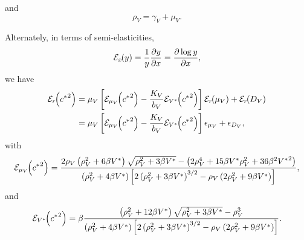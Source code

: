 \documentclass{article}
\newcommand{\md}{\mathrm{d}}
\newcommand{\elasticity}[2]{\mathcal{E}_{#2}\negthickspace\left({#1}\right)}
\begin{document}
and
\begin{equation}
  \rho_V = \gamma_V + \mu_V.
\end{equation}


Alternately, in terms of semi-elasticities,
\begin{equation}
  \elasticity{y}{x}
  = \frac{1}{y} \frac{\partial y}{\partial x}
  = \frac{\partial \log y}{\partial x},
\end{equation}
we have
\begin{equation}
  \begin{split}
    \elasticity{{c^*}^2}{r}
    &=
    \mu_V \left[
      \elasticity{{c^*}^2}{\mu_V}
      - \frac{K_V}{b_V} \elasticity{{c^*}^2}{V^*}
    \right]
    \elasticity{\mu_V}{r}
    +
    \elasticity{D_V}{r}
    \\
    &=
    \mu_V \left[
      \elasticity{{c^*}^2}{\mu_V}
      - \frac{K_V}{b_V} \elasticity{{c^*}^2}{V^*}
    \right]
    \epsilon_{\mu_V}
    +
    \epsilon_{D_V},
  \end{split}
\end{equation}
with
\begin{equation}
  \elasticity{{c^*}^2}{\mu_V}
  =
  \frac{
    2 \rho_V \left(\rho_V^2 + 6 \beta V^*\right)
    \sqrt{\rho_V^2 + 3 \beta V^*}
    - \left(
      2 \rho_V^4
      + 15 \beta V^* \rho_V^2
      + 36 \beta^2 {V^*}^2
    \right)
  }
  {\left(\rho_V^2 + 4 \beta V^*\right)
    \left[2 \left(\rho_V^2 + 3 \beta V^*\right)^{3/2}
      - \rho_V \left(2 \rho_V^2 + 9 \beta V^*\right)\right]},
\end{equation}
and
\begin{equation}
  \elasticity{{c^*}^2}{V^*}
  =
  \beta
  \frac{\left(\rho_V^2 + 12 \beta V^*\right)
    \sqrt{\rho_V^2 + 3 \beta V^*} - \rho_V^3}
  {\left(\rho_V^2 + 4 \beta V^*\right)
    \left[2 \left(\rho_V^2 + 3 \beta V^*\right)^{3/2}
      - \rho_V \left(2 \rho_V^2 + 9 \beta V^*\right)\right]}.
\end{equation}
\end{document}
